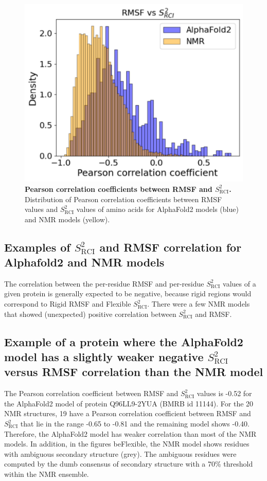 \begin{figure}[H]
    \centering
    \includegraphics[width=0.75\linewidth]{pLDDT//plddt_figures//supplementary_bhawna/supfig18.pdf}
    \caption{\textbf{Pearson correlation coefficients between RMSF and $S_{\text{RCI}}^{2}$.} Distribution of Pearson correlation coefficients between RMSF values and $S_{\text{RCI}}^{2}$ values of amino acids for AlphaFold2 models (blue) and NMR models (yellow).}
    \label{fig:plddt_sup:sup18}
\end{figure}

\subsection*{Examples of $S_{\text{RCI}}^{2}$ and RMSF correlation for Alphafold2 and NMR models}

The correlation between the per-residue RMSF and per-residue $S_{\text{RCI}}^{2}$ values of a given protein is generally expected to be negative, because rigid regions would correspond to Rigid RMSF and Flexible $S_{\text{RCI}}^{2}$. There were a few NMR models that showed (unexpected) positive correlation between $S_{\text{RCI}}^{2}$ and RMSF.

\subsection*{Example of a protein where the AlphaFold2 model has a slightly weaker negative $S_{\text{RCI}}^{2}$ versus RMSF correlation than the NMR model}

The Pearson correlation coefficient between RMSF and $S_{\text{RCI}}^{2}$ values is -0.52 for the AlphaFold2 model of protein Q96LL9-2YUA (BMRB id 11144). For the 20 NMR structures, 19 have a Pearson correlation coefficient between RMSF and $S_{\text{RCI}}^{2}$ that lie in the range -0.65 to -0.81 and the remaining model shows -0.40. Therefore, the AlphaFold2 model has weaker correlation than most of the NMR models. In addition, in the figures beFlexible, the NMR model shows residues with ambiguous secondary structure (grey). The ambiguous residues were computed by the dumb consensus of secondary structure with a 70\% threshold within the NMR ensemble.

